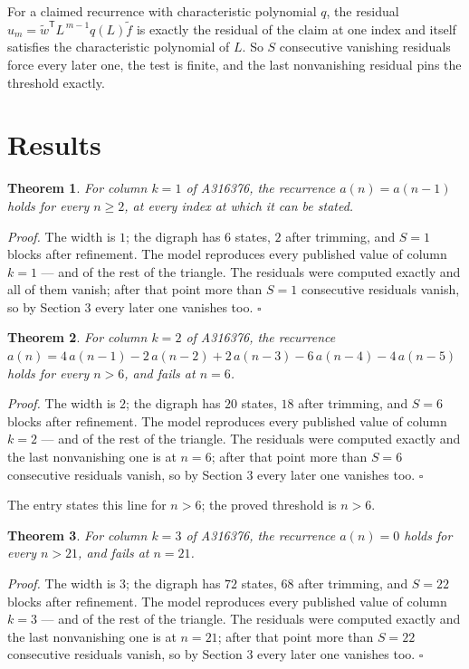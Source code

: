 \documentclass[11pt]{article}
\newtheorem{theorem}{Theorem}
\theoremstyle{definition}
\begin{document}
For a claimed recurrence with characteristic polynomial $q$, the residual $u_m = \tilde w^{\mathsf T}L^{\,m-1}q(L)\tilde f$ is exactly the residual of the claim at one index and itself satisfies the characteristic polynomial of $L$. So $S$ consecutive vanishing residuals force every later one, the test is finite, and the last nonvanishing residual pins the threshold exactly.

\section{Results}

\begin{theorem} For column $k = 1$ of A316376, the recurrence $a(n) = a(n-1)$ holds for every $n \ge 2$, at every index at which it can be stated.\end{theorem}

{\itshape Proof.} The width is $1$; the digraph has $6$ states, $2$ after trimming, and $S = 1$ blocks after refinement. The model reproduces every published value of column $k = 1$ --- and of the rest of the triangle. The residuals were computed exactly and all of them vanish; after that point more than $S = 1$ consecutive residuals vanish, so by Section 3 every later one vanishes too. $\square$

\begin{theorem} For column $k = 2$ of A316376, the recurrence $a(n) = 4\,a(n-1) - 2\,a(n-2) + 2\,a(n-3) - 6\,a(n-4) - 4\,a(n-5)$ holds for every $n > 6$, and fails at $n = 6$.\end{theorem}

{\itshape Proof.} The width is $2$; the digraph has $20$ states, $18$ after trimming, and $S = 6$ blocks after refinement. The model reproduces every published value of column $k = 2$ --- and of the rest of the triangle. The residuals were computed exactly and the last nonvanishing one is at $n = 6$; after that point more than $S = 6$ consecutive residuals vanish, so by Section 3 every later one vanishes too. $\square$

The entry states this line for $n > 6$; the proved threshold is $n > 6$.

\begin{theorem} For column $k = 3$ of A316376, the recurrence $a(n) = 0$ holds for every $n > 21$, and fails at $n = 21$.\end{theorem}

{\itshape Proof.} The width is $3$; the digraph has $72$ states, $68$ after trimming, and $S = 22$ blocks after refinement. The model reproduces every published value of column $k = 3$ --- and of the rest of the triangle. The residuals were computed exactly and the last nonvanishing one is at $n = 21$; after that point more than $S = 22$ consecutive residuals vanish, so by Section 3 every later one vanishes too. $\square$
\end{document}
